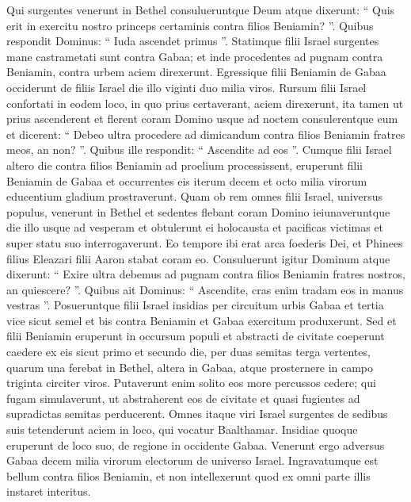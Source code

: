 \begin{biblechapter}
\begin{biblechapter}
\begin{biblechapter}
\begin{biblechapter}
\begin{biblechapter}
\begin{biblechapter}
\begin{biblechapter}
\begin{biblechapter}
\begin{biblechapter}
\begin{biblechapter}
\begin{biblechapter}
\begin{biblechapter}
\begin{biblechapter}
\begin{biblechapter}
\begin{biblechapter}
\begin{biblechapter}
\begin{biblechapter}
\begin{biblechapter}
\begin{biblechapter}
\begin{biblechapter}
\verse Qui surgentes venerunt in Bethel consulueruntque Deum atque dixerunt: “ Quis erit in exercitu nostro princeps certaminis contra filios Beniamin? ”. Quibus respondit Dominus: “ Iuda ascendet primus ”.
 \verse Statimque filii Israel surgentes mane castrametati sunt contra Gabaa; 
\verse et inde procedentes ad pugnam contra Beniamin, contra urbem aciem direxerunt. 
 \verse Egressique filii Beniamin de Gabaa occiderunt de filiis Israel die illo viginti duo milia viros. 
\verse Rursum filii Israel confortati in eodem loco, in quo prius certaverant, aciem direxerunt, 
\verse ita tamen ut prius ascenderent et flerent coram Domino usque ad noctem consulerentque eum et dicerent: “ Debeo ultra procedere ad dimicandum contra filios Beniamin fratres meos, an non? ”. Quibus ille respondit: “ Ascendite ad eos ”. 
\verse Cumque filii Israel altero die contra filios Beniamin ad proelium processissent, 
\verse eruperunt filii Beniamin de Gabaa et occurrentes eis iterum decem et octo milia virorum educentium gladium prostraverunt.
 \verse Quam ob rem omnes filii Israel, universus populus, venerunt in Bethel et sedentes flebant coram Domino ieiunaveruntque die illo usque ad vesperam et obtulerunt ei holocausta et pacificas victimas 
\verse et super statu suo interrogaverunt. Eo tempore ibi erat arca foederis Dei, 
\verse et Phinees filius Eleazari filii Aaron stabat coram eo. Consuluerunt igitur Dominum atque dixerunt: “ Exire ultra debemus ad pugnam contra filios Beniamin fratres nostros, an quiescere? ”. Quibus ait Dominus: “ Ascendite, cras enim tradam eos in manus vestras ”.
 \verse Posueruntque filii Israel insidias per circuitum urbis Gabaa 
\verse et tertia vice sicut semel et bis contra Beniamin et Gabaa exercitum produxerunt. 
\verse Sed et filii Beniamin eruperunt in occursum populi et abstracti de civitate coeperunt caedere ex eis sicut primo et secundo die, per duas semitas terga vertentes, quarum una ferebat in Bethel, altera in Gabaa, atque prosternere in campo triginta circiter viros. 
\verse Putaverunt enim solito eos more percussos cedere; qui fugam simulaverunt, ut abstraherent eos de civitate et quasi fugientes ad supradictas semitas perducerent. 
\verse Omnes itaque viri Israel surgentes de sedibus suis tetenderunt aciem in loco, qui vocatur Baalthamar. Insidiae quoque eruperunt de loco suo, de regione in occidente Gabaa. 
\verse Venerunt ergo adversus Gabaa decem milia virorum electorum de universo Israel. Ingravatumque est bellum contra filios Beniamin, et non intellexerunt quod ex omni parte illis instaret interitus. 

\end{biblechapter}
\end{biblechapter}
\end{biblechapter}
\end{biblechapter}
\end{biblechapter}
\end{biblechapter}
\end{biblechapter}
\end{biblechapter}
\end{biblechapter}
\end{biblechapter}
\end{biblechapter}
\end{biblechapter}
\end{biblechapter}
\end{biblechapter}
\end{biblechapter}
\end{biblechapter}
\end{biblechapter}
\end{biblechapter}
\end{biblechapter}
\end{biblechapter}
